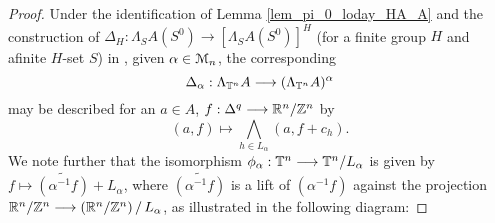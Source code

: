\begin{prop}
\begin{proof}
      Under the identification of Lemma \ref{lem_pi_0_loday_HA_A} and the construction of $\Delta_H: \Lambda_{S} A (S^0) \to \left[\Lambda_{S} A (S^0)\right]^H$ (for a finite group $H$ and afinite $H$-set $S$) in \cite[Section 6.2]{carlsson2011higher}, given $\alpha \in \mathcal{M}_n$, the corresponding
        \[ \Delta_\alpha: \Lambda_{\mathbb{T}^n} A \longrightarrow (\Lambda_{\mathbb{T}^n} A)^\alpha \]
      may be described for an $a \in A$, $f:\Delta^q \longrightarrow \mathbb{R}^n/\mathbb{Z}^n$ by
        \[ (a,f) \mapsto \bigwedge\limits_{h \in L_\alpha} (a, f+c_h).	\]
      We note further that the isomorphism $\phi_\alpha: \mathbb{T}^n \longrightarrow \mathbb{T}^n/L_\alpha$ is given by $f \mapsto \widetilde{(\alpha^{-1} f)} + L_\alpha$, where $\widetilde{(\alpha^{-1} f)}$ is a lift of $(\alpha^{-1} f)$ against the projection $\bR^n/\bZ^n \to \quotient{(\bR^n/\bZ^n)}{L_\alpha}$, as illustrated in the following diagram:

\end{proof}
\end{prop}
